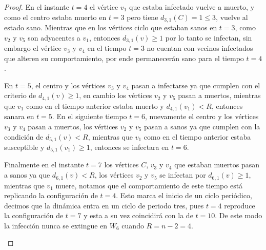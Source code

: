 \documentclass[12pt,titlepage,twoside,openright]{book}
\begin{document}
\begin{proof}
    En el instante $t=4$ el v\'ertice $v_1$ que estaba infectado vuelve a muerto, y como el centro estaba muerto en $t=3$ pero tiene $d_{3,1}(C)=1\leq 3$, vuelve al estado sano. Mientras que en los v\'ertices ciclo que estaban sanos en $t=3$, como $v_2$ y $v_5$ son adyacentes a $v_1$, entonces $d_{3,1}(v) \geq 1$ por lo tanto se infectan, sin embargo el v\'ertice $v_3$ y $v_4$ en el tiempo $t=3$ no cuentan con vecinos infectados que alteren su comportamiento, por ende permanecer\'an sano para el tiempo $t=4$.

    En $t=5$, el centro y los v\'ertices $v_3$ y $v_4$ pasan a infectarse ya que cumplen con el criterio de $d_{4,1}(v)\geq 1$, en cambio los v\'ertices $v_2$ y $v_5$ pasan a muertos, mientras que $v_1$ como en el tiempo anterior estaba muerto y $d_{4,1}(v_1) < R$, entonces sanara en $t=5$. En el siguiente tiempo $t=6$, nuevamente el centro y los v\'ertices $v_3$ y $v_4$ pasan a muertos, los v\'ertices $v_2$ y $v_5$ pasan a sanos ya que cumplen con la condici\'on de $d_{5,1}(v) < R$, mientras que $v_1$ como en el tiempo anterior estaba susceptible y $d_{5,1}(v_1) \geq 1$, entonces se infectara en $t=6$.
    
    Finalmente en el instante $t=7$ los v\'ertices $C$, $v_3$ y $v_4$ que estaban muertos pasan a sanos ya que $d_{6,1}(v) < R$, los v\'ertices $v_2$ y $v_5$ se infectan por $d_{6,1}(v)\geq 1$, mientras que $v_1$ muere, notamos que el comportamiento de este tiempo est\'a replicando la configuraci\'on de $t=4$. Esto marca el inicio de un ciclo peri\'odico, decimos que la din\'amica entra en un ciclo de periodo tres, pues $t=4$ reproduce la configuraci\'on de $t=7$ y esta a su vez coincidir\'a con la de $t=10$. De este modo la infecci\'on nunca se extingue en $W_6$ cuando $R=n-2=4$.

    \begin{figure}[h]
    \centering
\end{figure}
\end{proof}
\end{document}
